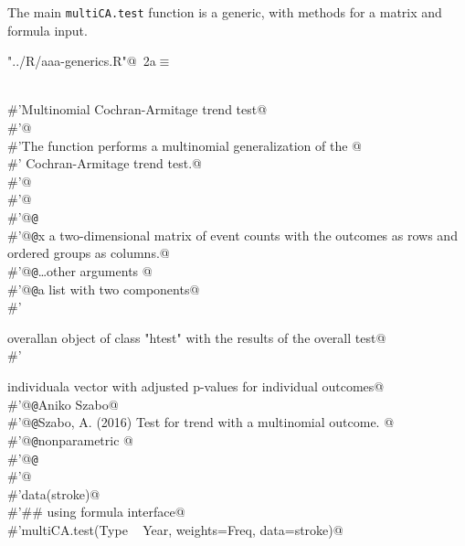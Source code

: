 \documentclass[reqno]{amsart}
\renewcommand{\NWtarget}[2]{\hypertarget{#1}{#2}}
\begin{document}
The main \texttt{multiCA.test} function is a generic, with methods for a matrix and formula input.

\begin{flushleft} \small
\begin{minipage}{\linewidth}\label{scrap1}\raggedright\small
\NWtarget{nuweb2a}{} \verb@"../R/aaa-generics.R"@\nobreak\ {\footnotesize {2a}}$\equiv$
\vspace{-1ex}
\begin{list}{}{} \item
\mbox{}\verb@@\\
\mbox{}\verb@#'Multinomial Cochran-Armitage trend test@\\
\mbox{}\verb@#'@\\
\mbox{}\verb@#'The  function performs a multinomial generalization of the @\\
\mbox{}\verb@#' Cochran-Armitage trend test.@\\
\mbox{}\verb@#'@\\
\mbox{}\verb@#'@\\
\mbox{}\verb@#'@{\tt @}\verb@export@\\
\mbox{}\verb@#'@{\tt @}\verb@param x a two-dimensional matrix of event counts with the outcomes as rows and ordered groups as columns.@\\
\mbox{}\verb@#'@{\tt @}\verb@param \dots other arguments @\\
\mbox{}\verb@#'@{\tt @}\verb@return a list with two components@\\
\mbox{}\verb@#' \item{overall}{an object of class "htest" with the results of the overall test}@\\
\mbox{}\verb@#' \item{individual}{a vector with adjusted p-values for individual outcomes}@\\
\mbox{}\verb@#'@{\tt @}\verb@author Aniko Szabo@\\
\mbox{}\verb@#'@{\tt @}\verb@references Szabo, A. (2016) Test for trend with a multinomial outcome.  @\\
\mbox{}\verb@#'@{\tt @}\verb@keywords nonparametric @\\
\mbox{}\verb@#'@{\tt @}\verb@examples@\\
\mbox{}\verb@#'@\\
\mbox{}\verb@#'data(stroke)@\\
\mbox{}\verb@#'## using formula interface@\\
\mbox{}\verb@#'multiCA.test(Type ~ Year, weights=Freq, data=stroke)@\\

\end{list}
\end{minipage}
\end{flushleft}
\end{document}
